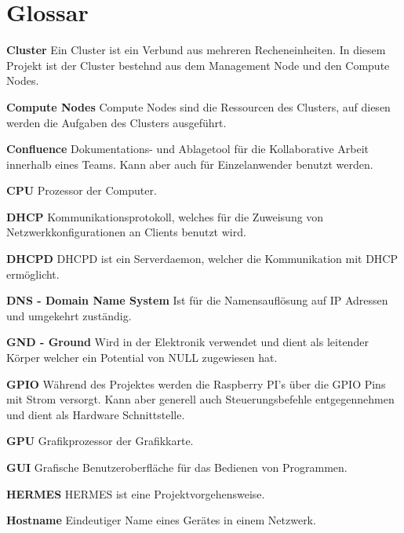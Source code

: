 \section{Glossar}
\textbf{Cluster}\newline
Ein Cluster ist ein Verbund aus mehreren Recheneinheiten. In diesem Projekt ist der Cluster bestehnd aus dem Management Node und den Compute Nodes.

\textbf{Compute Nodes}\newline
Compute Nodes sind die Ressourcen des Clusters, auf diesen werden die Aufgaben des Clusters ausgeführt.

\textbf{Confluence}\newline
Dokumentations- und Ablagetool für die Kollaborative Arbeit innerhalb eines Teams. Kann aber auch für Einzelanwender benutzt werden. 

\textbf{CPU}\newline
Prozessor der Computer.

\textbf{DHCP}\newline
Kommunikationsprotokoll, welches für die Zuweisung von Netzwerkkonfigurationen an Clients benutzt wird.

\textbf{DHCPD}\newline
DHCPD ist ein Serverdaemon, welcher die Kommunikation mit DHCP ermöglicht.

\textbf{DNS - Domain Name System}\newline
Ist für die Namensauflösung auf IP Adressen und umgekehrt zuständig.

\textbf{GND - Ground}\newline
Wird in der Elektronik verwendet und dient als leitender Körper welcher ein Potential von NULL zugewiesen hat. 

\textbf{GPIO}\newline
Während des Projektes werden die Raspberry PI's über die GPIO Pins mit Strom versorgt. Kann aber generell auch Steuerungsbefehle entgegennehmen und dient als Hardware Schnittstelle.

\textbf{GPU}\newline
Grafikprozessor der Grafikkarte.

\textbf{GUI}\newline
Grafische Benutzeroberfläche für das Bedienen von Programmen.

\textbf{HERMES}\newline
HERMES ist eine Projektvorgehensweise.

\textbf{Hostname}\newline
Eindeutiger Name eines Gerätes in einem Netzwerk.

